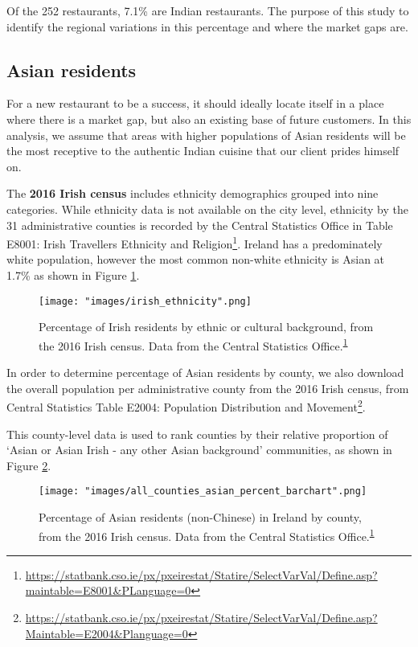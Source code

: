 \documentclass[a4paper,11pt]{article}
\begin{document}
Of the 252 restaurants, 7.1\% are Indian restaurants. The purpose of this study to identify the regional variations in this percentage and where the market gaps are.

\subsection{Asian residents}
For a new restaurant to be a success, it should ideally locate itself in a place where there is a market gap, but also an existing base of future customers. In this analysis, we assume that areas with higher populations of Asian residents will be the most receptive to the authentic Indian cuisine that our client prides himself on. 

The \textbf{2016 Irish census} includes ethnicity demographics grouped into nine categories. While ethnicity data is not available on the city level, ethnicity by the 31 administrative counties is recorded by the Central Statistics Office in Table E8001: Irish Travellers Ethnicity and Religion\footnote{\url{https://statbank.cso.ie/px/pxeirestat/Statire/SelectVarVal/Define.asp?maintable=E8001&PLanguage=0}\label{footnote:irish ethnicity}}. Ireland has a predominately white population, however the most common non-white ethnicity is Asian at 1.7\% as shown in Figure \ref{fig:irish ethnicity}. 

\begin{figure}[htb]
   \centering
   \texttt{[image: "images/irish\_ethnicity".png]}
      \caption{Percentage of Irish residents by ethnic or cultural background, from the 2016 Irish census. Data from the Central Statistics Office.\textsuperscript{\ref{footnote:irish ethnicity}}}
      \label{fig:irish ethnicity}
\end{figure}

In order to determine percentage of Asian residents by county, we also download the overall population per administrative county from the 2016 Irish census, from Central Statistics Table E2004: Population Distribution and Movement\footnote{\url{https://statbank.cso.ie/px/pxeirestat/Statire/SelectVarVal/Define.asp?Maintable=E2004&Planguage=0}}.

This county-level data is used to rank counties by their relative proportion of `Asian or Asian Irish - any other Asian background' communities, as shown in Figure \ref{fig:asian by county}.

\begin{figure}[htb]
   \centering
   \texttt{[image: "images/all\_counties\_asian\_percent\_barchart".png]}
      \caption{Percentage of Asian residents (non-Chinese) in Ireland by county, from the 2016 Irish census. Data from the Central Statistics Office.\textsuperscript{\ref{footnote:irish ethnicity}}}
      \label{fig:asian by county}
\end{figure}
\end{document}
